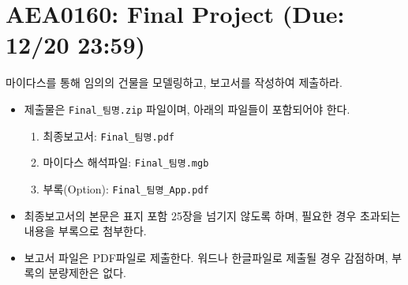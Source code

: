 \documentclass[10pt]{article}
\begin{document}
\section*{AEA0160: Final Project (Due: 12/20 23:59)}
마이다스를 통해 임의의 건물을 모델링하고, 보고서를 작성하여 제출하라. 

\begin{itemize}
	\item 제출물은 \texttt{Final\_팀명.zip} 파일이며, 아래의 파일들이 포함되어야 한다.   

\begin{enumerate}
	\item 최종보고서: \texttt{Final\_팀명.pdf}
	\item 마이다스 해석파일: \texttt{Final\_팀명.mgb}
	\item 부록(Option): \texttt{Final\_팀명\_App.pdf}
\end{enumerate}
	\item 최종보고서의 본문은 표지 포함 25장을 넘기지 않도록 하며, 필요한 경우 초과되는 내용을 부록으로 첨부한다. 
	\item 보고서 파일은 PDF파일로 제출한다. 워드나 한글파일로 제출될 경우 감점하며, 부록의 분량제한은 없다. 
\end{itemize}
\end{document}
